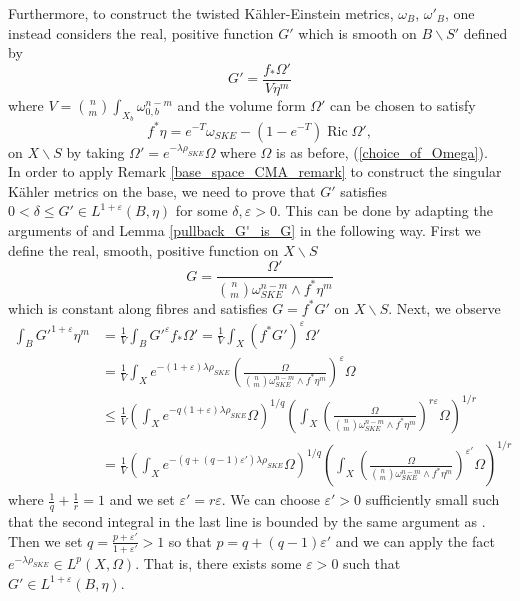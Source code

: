 \documentclass[12pt]{article}
\numberwithin{equation}{section}
\newcommand{\e}{\varepsilon}
\DeclareMathOperator{\Ric}{Ric}
\begin{document}
\noindent Furthermore, to construct the twisted K\"ahler-Einstein metrics, $\omega_{B}$, $\omega'_B$, one instead considers the real, positive function $G'$ which is smooth on $B \backslash S'$ defined by
\begin{equation*}
    G' = \frac{f_*\Omega'}{V\eta^m}
\end{equation*}
where $V = {n\choose m} \int_{X_b} \omega_{0,b}^{n-m}$ and the volume form $\Omega'$ can be chosen to satisfy
\begin{equation*}
    f^*\eta = e^{-T} \omega_{SKE} - (1-e^{-T})\Ric \Omega',
\end{equation*} 
on $X \backslash S$ by taking $\Omega' = e^{-\lambda \rho_{SKE}}\Omega$ where $\Omega$ is as before, (\ref{choice_of_Omega}).\\
In order to apply Remark \ref{base_space_CMA_remark} to construct the singular K\"ahler metrics on the base, we need to prove that $G'$ satisfies $0 < \delta \leq G' \in L^{1+\e}(B,\eta)$ for some $\delta, \e > 0$. This can be done by adapting the arguments of \cite{ST12} and Lemma \ref{pullback_G'_is_G} in the following way. First we define the real, smooth, positive function on $X\backslash S$
\begin{equation*}
    G = \frac{\Omega'}{{n \choose m} \omega_{SKE}^{n-m} \wedge f^*\eta^m}
\end{equation*}
which is constant along fibres and satisfies $G = f^* G'$ on $X \backslash S$. Next, we observe
\begin{align*}
    \int_B G'^{1+\e} \eta^m &= \frac{1}{V}\int_B G'^{\e} f_*\Omega' = \frac{1}{V}\int_X (f^* G')^{\e} \Omega'\\
    &= \frac{1}{V} \int_X e^{-(1+\e)\lambda\rho_{SKE}}\left(\frac{\Omega}{{n\choose m} \omega_{SKE}^{n-m} \wedge f^*\eta^m}\right)^\e \Omega \\
    &\leq \frac{1}{V}\left(\int_X e^{-q(1+\e)\lambda \rho_{SKE}} \Omega\right)^{1/q} \left(\int_X \left(\frac{\Omega}{{n\choose m} \omega_{SKE}^{n-m} \wedge f^*\eta^m}\right)^{r\e}\Omega\right)^{1/r}\\
    &= \frac{1}{V}\left(\int_X e^{-(q+(q-1)\e')\lambda \rho_{SKE}} \Omega\right)^{1/q} \left(\int_X \left(\frac{\Omega}{{n\choose m} \omega_{SKE}^{n-m} \wedge f^*\eta^m}\right)^{\e'}\Omega\right)^{1/r}
\end{align*}
where $\frac{1}{q}+\frac{1}{r} = 1$ and we set $\e' = r\e$. We can choose $\e' > 0$ sufficiently small such that the second integral in the last line is bounded by the same argument as \cite[Prop. 3.2]{ST12}. Then we set $q = \frac{p + \e'}{1+\e'} > 1$ so that $p = q + (q-1)\e'$ and we can apply the fact $e^{-\lambda \rho_{SKE}} \in L^p(X,\Omega)$. That is, there exists some $\e > 0$ such that $G' \in L^{1+\e}(B,\eta)$.\\
\end{document}
